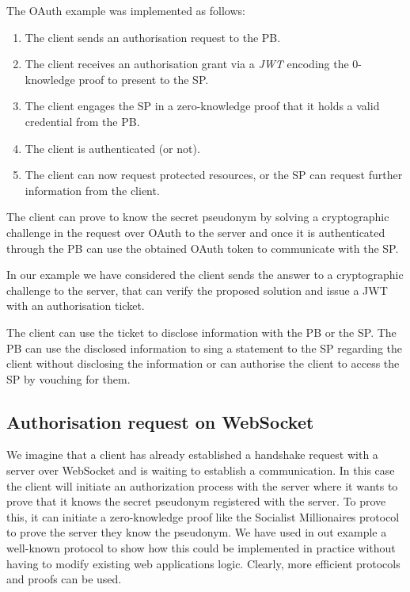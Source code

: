 The OAuth example was implemented as follows:

\begin{enumerate}
    \item The client sends an authorisation request to the PB.
    \item The client receives an authorisation grant via a \emph{JWT} encoding the 0-knowledge proof to present to the SP.
    \item The client engages the SP in a zero-knowledge proof that it holds a valid credential from the PB.
    \item The client is authenticated (or not).
    \item The client can now request protected resources, or the SP can request further information from the client.
\end{enumerate}

The client can prove to know the secret pseudonym by solving a cryptographic challenge in the request over OAuth to the server and once it is authenticated through the PB can use the obtained OAuth token to communicate with the SP. 

In our example we have considered the client sends the answer to a cryptographic challenge to the server, that can verify the proposed solution and issue a JWT with an authorisation ticket. 

The client can use the ticket to disclose information with the PB or the SP. The PB can use the disclosed information to sing a statement to the SP regarding the client without disclosing the information or can authorise the client to access the SP by vouching for them.

\subsection{Authorisation request on WebSocket}

We imagine that a client has already established a handshake request with a server over WebSocket and is waiting to establish a communication. In this case the client will initiate an authorization process with the server where it wants to prove that it knows the secret pseudonym registered with the server. To prove this, it can initiate a zero-knowledge proof like the Socialist Millionaires protocol to prove the server they know the pseudonym. 
We have used in out example a well-known protocol to show how this could be implemented in practice without having to modify existing web applications logic. Clearly, more efficient protocols and proofs can be used.

